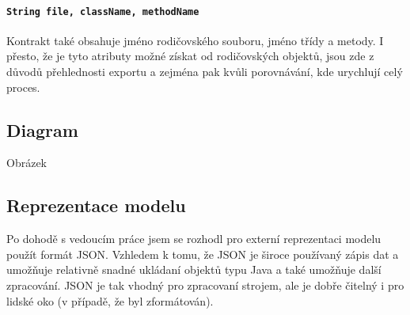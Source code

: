 			\paragraph{\texttt{String file, className, methodName}} Kontrakt také obsahuje jméno rodičovského souboru, jméno třídy a metody. I přesto, že je tyto atributy možné získat od rodičovských objektů, jsou zde z důvodů přehlednosti exportu a zejména pak kvůli porovnávání, kde urychlují celý proces.
		
		\subsection{Diagram}
			Obrázek
			
		\subsection{Reprezentace modelu}
			Po dohodě s vedoucím práce jsem se rozhodl pro externí reprezentaci modelu použít formát JSON. Vzhledem k tomu, že JSON je široce používaný zápis dat a umožňuje relativně snadné ukládaní objektů typu Java a také umožňuje další zpracování. JSON je tak vhodný pro zpracovaní strojem, ale je dobře čitelný i pro lidské oko (v případě, že byl zformátován).